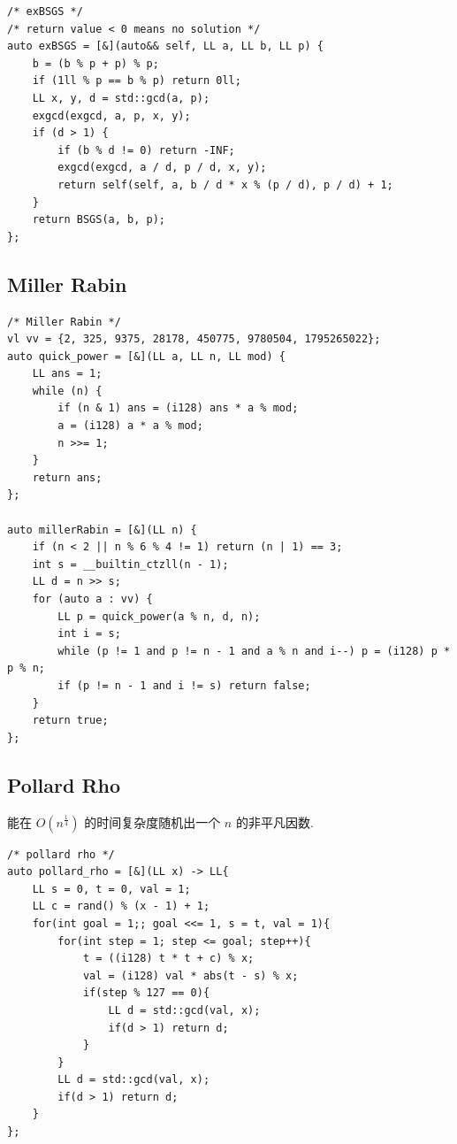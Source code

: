 \documentclass[UTF8, a4paper, titlepage, twoside]{ctexart}
\begin{document}
\begin{lstlisting}[style=cpp]
/* exBSGS */
/* return value < 0 means no solution */
auto exBSGS = [&](auto&& self, LL a, LL b, LL p) {
    b = (b % p + p) % p;
    if (1ll % p == b % p) return 0ll;
    LL x, y, d = std::gcd(a, p);
    exgcd(exgcd, a, p, x, y);
    if (d > 1) {
        if (b % d != 0) return -INF;
        exgcd(exgcd, a / d, p / d, x, y);
        return self(self, a, b / d * x % (p / d), p / d) + 1;
    }
    return BSGS(a, b, p);
};
\end{lstlisting}

\subsection{ Miller Rabin }
\begin{lstlisting}[style=cpp]
/* Miller Rabin */
vl vv = {2, 325, 9375, 28178, 450775, 9780504, 1795265022};
auto quick_power = [&](LL a, LL n, LL mod) {
    LL ans = 1;
    while (n) {
        if (n & 1) ans = (i128) ans * a % mod;
        a = (i128) a * a % mod;
        n >>= 1;
    }
    return ans;
};

auto millerRabin = [&](LL n) {
    if (n < 2 || n % 6 % 4 != 1) return (n | 1) == 3;
    int s = __builtin_ctzll(n - 1);
    LL d = n >> s;
    for (auto a : vv) {
        LL p = quick_power(a % n, d, n);
        int i = s;
        while (p != 1 and p != n - 1 and a % n and i--) p = (i128) p * p % n;
        if (p != n - 1 and i != s) return false;
    }
    return true;
};
\end{lstlisting}

\subsection{ Pollard Rho }
能在 \(O(n^{\frac{1}{4}})\) 的时间复杂度随机出一个 \(n\) 的非平凡因数.

\begin{lstlisting}[style=cpp]
/* pollard rho */
auto pollard_rho = [&](LL x) -> LL{
    LL s = 0, t = 0, val = 1;
    LL c = rand() % (x - 1) + 1;
    for(int goal = 1;; goal <<= 1, s = t, val = 1){
        for(int step = 1; step <= goal; step++){
            t = ((i128) t * t + c) % x;
            val = (i128) val * abs(t - s) % x;
            if(step % 127 == 0){
                LL d = std::gcd(val, x);
                if(d > 1) return d;
            }
        }
        LL d = std::gcd(val, x);
        if(d > 1) return d;
    }
};
\end{lstlisting}
\end{document}
